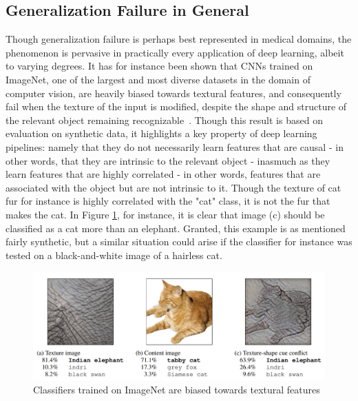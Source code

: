 	\subsection{Generalization Failure in General}
	Though generalization failure is perhaps best represented in medical domains, the phenomenon is pervasive in practically every application of deep learning, albeit to varying degrees. It has for instance been shown that CNNs trained on ImageNet, one of the largest and most diverse datasets in the domain of computer vision, are heavily biased towards textural features, and consequently fail when the texture of the input is modified, despite the shape and structure of the relevant object remaining recognizable~\cite{texturebias}. Though this result is based on evaluation on synthetic data, it highlights a key property of deep learning pipelines: namely that they do not necessarily learn features that are causal - in other words, that they are intrinsic to the relevant object - inasmuch as they learn features that are highly correlated - in other words, features that are associated with the object but are not intrinsic to it. Though the texture of cat fur for instance is highly correlated with the "cat" class, it is not the fur that makes the cat. In Figure \ref{cat_elephant}, for instance, it is clear that image (c) should be classified as a cat more than an elephant. Granted, this example is as mentioned fairly synthetic, but a similar situation could arise if the classifier for instance was tested on a black-and-white image of a hairless cat. 
	\begin{figure}[h]
		\includegraphics[width=\linewidth]{illustrations/cat_elephant.png}
		\caption{Classifiers trained on ImageNet are biased towards textural features}
		\label{cat_elephant}
	\end{figure}
	
